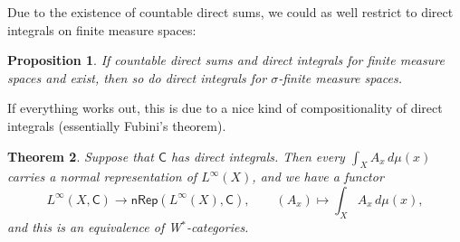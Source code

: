\documentclass[reqno,T1]{amsproc}
\newcommand{\cat}[1]{\mathsf{#1}}		%
\newcommand{\NRep}[1]{\mathsf{nRep}(#1)}	%
\theoremstyle{plain}
\newtheorem{thm}{Theorem}[section]
\newtheorem{prop}[thm]{Proposition}
\theoremstyle{remark}
\numberwithin{equation}{section}
\begin{document}

Due to the existence of countable direct sums, we could as well restrict to direct integrals on finite measure spaces:

\begin{prop}
If countable direct sums and direct integrals for finite measure spaces and exist, then so do direct integrals for $\sigma$-finite measure spaces.
\end{prop}

If everything works out, this is due to a nice kind of compositionality of direct integrals (essentially Fubini's theorem).


\begin{thm}
Suppose that $\cat{C}$ has direct integrals. Then every $\int_X A_x \, d\mu(x)$ carries a normal representation of $L^\infty(X)$, and we have a functor
\[
	L^\infty(X,\cat{C}) \to \NRep{L^\infty(X),\cat{C}} , \qquad (A_x) \mapsto \int_X A_x \, d\mu(x),
\]
and this is an equivalence of W$^*$-categories.
\end{thm}




\end{document}
